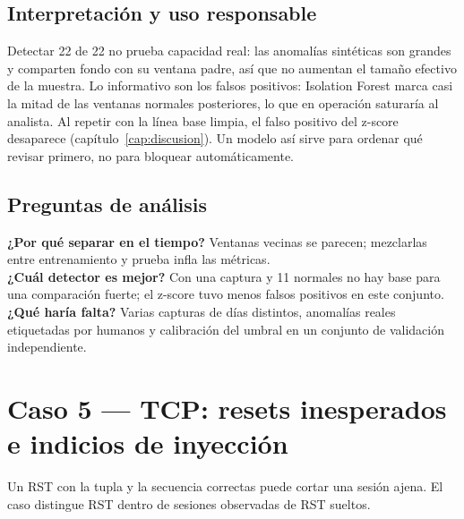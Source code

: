 
\subsection{Interpretación y uso responsable}
Detectar 22 de 22 no prueba capacidad real: las anomalías sintéticas son grandes y comparten fondo con su ventana padre, así que no aumentan el tamaño efectivo de la muestra. Lo informativo son los falsos positivos: Isolation Forest marca casi la mitad de las ventanas normales posteriores, lo que en operación saturaría al analista. Al repetir con la línea base limpia, el falso positivo del z-score desaparece (capítulo~\ref{cap:discusion}). Un modelo así sirve para ordenar qué revisar primero, no para bloquear automáticamente.

\subsection{Preguntas de análisis}
\textbf{¿Por qué separar en el tiempo?} Ventanas vecinas se parecen; mezclarlas entre entrenamiento y prueba infla las métricas.\\
\textbf{¿Cuál detector es mejor?} Con una captura y 11 normales no hay base para una comparación fuerte; el z-score tuvo menos falsos positivos en este conjunto.\\
\textbf{¿Qué haría falta?} Varias capturas de días distintos, anomalías reales etiquetadas por humanos y calibración del umbral en un conjunto de validación independiente.

\section{Caso 5 — TCP: resets inesperados e indicios de inyección}
Un RST con la tupla y la secuencia correctas puede cortar una sesión ajena. El caso distingue RST dentro de sesiones observadas de RST sueltos.

